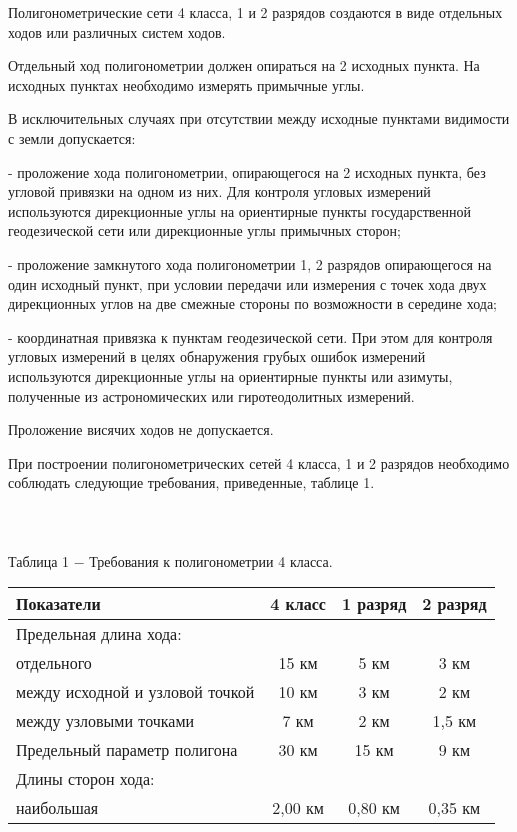 \documentclass[a4paper]{article}
\begin{document}
\large{
\par Полигонометрические сети 4 класса, 1 и 2 разрядов создаются в виде отдельных ходов или различных систем ходов.
\par Отдельный ход полигонометрии должен опираться на 2 исходных пункта. На исходных пунктах необходимо измерять примычные углы.
\par В исключительных случаях при отсутствии между исходные пунктами видимости с земли допускается:
\par - проложение хода полигонометрии, опирающегося на 2 исходных пункта, без угловой привязки на одном из них. Для контроля угловых измерений используются дирекционные углы на ориентирные пункты государственной геодезической сети или дирекционные углы примычных сторон;
\par- проложение замкнутого хода полигонометрии 1, 2 разрядов опирающегося на один исходный пункт, при условии передачи или измерения с точек хода двух дирекционных углов на две смежные стороны по возможности в середине хода;
\par- координатная привязка к пунктам геодезической сети. При этом для контроля угловых измерений в целях обнаружения грубых ошибок измерений используются дирекционные углы на ориентирные пункты или азимуты, полученные из астрономических или гиротеодолитных измерений.
\par Проложение висячих ходов не допускается.
\par При построении полигонометрических сетей 4 класса, 1 и 2 разрядов необходимо соблюдать следующие требования, приведенные, таблице 1.\\
\\
\\
\\
Таблица 1 $-$ Требования к полигонометрии 4 класса.\\
\begin{tabular}{|l|c|c|c|}
\hline
Показатели & 4 класс & 1 разряд & 2 разряд \\
\hline
Предельная длина хода: & & & \\
отдельного & 15 км & 5 км & 3 км \\
между исходной и узловой точкой & 10 км & 3 км & 2 км\\
между узловыми точками& 7 км & 2 км & 1,5 км \\
\hline
Предельный параметр полигона & 30 км & 15 км & 9 км \\
\hline
Длины сторон хода: & & & \\
наибольшая & 2,00 км & 0,80 км & 0,35 км \\

\end{tabular}}
\end{document}
